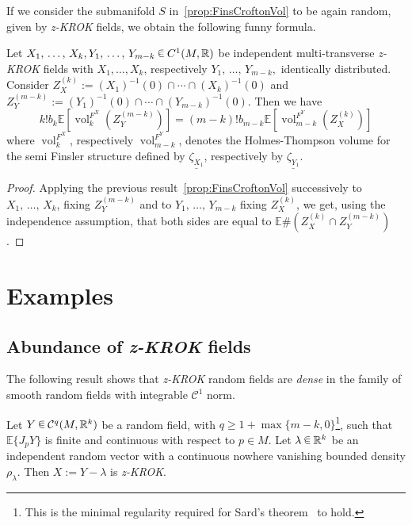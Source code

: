 \documentclass[AHL, Unicode, longabstracts, published]{cedram}
\newcommand{\R}{\mathbb{R}}
\newcommand{\EE}{\mathbb{E}}
\DeclareMathOperator{\vol}{vol}
\newcommand{\mC}{\mathcal{C}}
\newcommand{\seg}{\underline}
\newcommand{\zkrok}{\emph{z-KROK}\xspace}
\newcommand{\uball}{b}
\newcommand*\randin{
\mathchoice {\raisebox{-.35ex}{$\displaystyle{^\subset}$}\mkern-11.5mu\raisebox{+.45ex}{$\displaystyle{_\subset}$}} {\mkern+1mu\raisebox{-.27ex}{$\textstyle{^\subset}$}\mkern-11.7mu\raisebox{+.45ex}{$\textstyle{_\subset}$}} {\raisebox{.35ex}{$\scriptstyle\subset$}\mkern-14mu\raisebox{-.15ex}{$\scriptstyle\subset$}} {\raisebox{.3ex}{$\scriptscriptstyle\subset$}\mkern-13.5mu\raisebox{-.10ex}{$\scriptscriptstyle\subset$}}}
\begin{document}
If we consider the submanifold $S$ in~\cref{prop:FinsCroftonVol} to be again random, given by \zkrok fields, we obtain the following funny formula.

\begin{coro}\label{cor:funny}
Let $X_1,\,\ldots,\,X_k,Y_1,\,\ldots,\,Y_{m-k}\,\randin\, C^1(M,\R)$ be independent multi-transverse \zkrok fields with $X_1,\ldots,X_k$, respectively $Y_1,\,\ldots,\,Y_{m-k},$ identically distributed. Consider $Z_X^{(k)}:=(X_1)^{-1}(0)\cap\cdots\cap (X_k)^{-1}(0)$ and $Z_Y^{(m-k)}:=(Y_1)^{-1}(0)\cap\cdots\cap (Y_{m-k})^{-1}(0)$. Then we have
\begin{equation*}
k!\uball_k\EE\left[\vol_k^{F^X}\left(Z_Y^{(m-k)}\right)\right]=(m-k)!\uball_{m-k}\EE\left[\vol_{m-k}^{F^Y}\left(Z_X^{(k)}\right)\right]
\end{equation*}
where $\vol_k^{F^X}$, respectively $\vol_{m-k}^{F^Y}$, denotes the Holmes-Thompson volume for the semi Finsler structure defined by $\seg{\zeta_{X_1}}$, respectively by $\seg{\zeta_{Y_1}}$.
\end{coro}

\begin{proof}
Applying the previous result~\cref{prop:FinsCroftonVol} successively to $X_1,\,\ldots,\,X_k$, fixing $Z_Y^{(m-k)}$ and to $Y_1,\,\ldots,\,Y_{m-k}$ fixing $Z_X^{(k)}$, we get, using the independence assumption, that both sides are equal to $\EE\#(Z_X^{(k)}\cap Z_Y^{(m-k)})$.
\end{proof}


\section{Examples}\label{sec:ex}
\subsection{Abundance of {\zkrok} fields}\label{sub:abu}

The following result shows that \zkrok random fields are \emph{dense} in the family of smooth random fields with integrable $\mC^1$ norm.

\begin{theo}\label{thm:abundance}
Let $Y\,\randin\, \mC^q(M,\R^k)$ be a random field, with $q\ge 1+\max\{m-k,0\}$\footnote{This is the minimal regularity required for Sard's theorem~\cite{sard} to hold.}, such that $\EE\{J_pY\}$ is finite and continuous with respect to $p\in M$. Let $\lambda\,\randin\, \R^k$ be an independent random vector with a continuous nowhere vanishing bounded density $\rho_\lambda$. Then $X:=Y-\lambda$ is \zkrok.
\end{theo}
\end{document}

